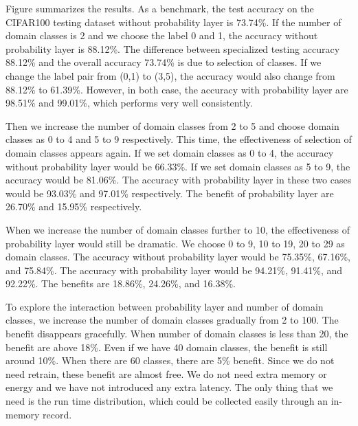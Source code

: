 \documentclass[pageno]{jpaper}
\begin{document}
Figure 
summarizes the results. As a benchmark, the test accuracy on the CIFAR100 testing dataset without probability layer is 73.74\%. If the number of domain classes is 2 and we choose the label 0 and 1, the accuracy without probability layer is 88.12\%. The difference between specialized testing accuracy 88.12\% and the overall accuracy 73.74\% is due to selection of classes. If we change the label pair from (0,1) to (3,5), the accuracy would also change from 88.12\% to 61.39\%. However, in both case, the accuracy with probability layer are 98.51\% and 99.01\%, which performs very well consistently. 

Then we increase the number of domain classes from 2 to 5 and choose domain classes as 0 to 4 and 5 to 9 respectively. This time, the effectiveness of selection of domain classes appears again. If we set domain classes as 0 to 4, the accuracy without probability layer would be 66.33\%. If we set domain classes as 5 to 9, the accuracy would be 81.06\%. The accuracy with probability layer in these two cases would be 93.03\% and 97.01\% respectively. The benefit of probability layer are 26.70\% and 15.95\% respectively.

When we increase the number of domain classes further to 10, the effectiveness of probability layer would still be dramatic. We choose 0 to 9, 10 to 19, 20 to 29 as domain classes. The accuracy without probability layer would be 75.35\%, 67.16\%, and 75.84\%. The accuracy with probability layer would be 94.21\%, 91.41\%, and 92.22\%. The benefits are 18.86\%, 24.26\%, and 16.38\%.

To explore the interaction between probability layer and number of domain classes, we increase the number of domain classes gradually from 2 to 100. The benefit disappears gracefully. When number of domain classes is less than 20, the benefit are above 18\%. Even if we have 40 domain classes, the benefit is still around 10\%. When there are 60 classes, there are 5\% benefit. Since we do not need retrain, these benefit are almost free. We do not need extra memory or energy and we have not introduced any extra latency. The only thing that we need is the run time distribution, which could be collected easily through an in-memory record.
\end{document}
